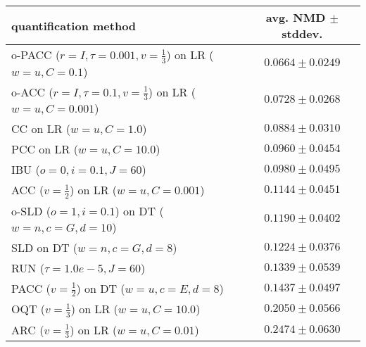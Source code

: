 \begin{tabular}{lc}
  \toprule
  quantification method & avg. NMD $\pm$ stddev. \\
  \midrule
  o-PACC ($r=I, \tau=0.001, v=\frac{1}{3}$) on LR ($w=u, C=0.1$) & $\mathbf{0.0664 \pm 0.0249}$ \\
  o-ACC ($r=I, \tau=0.1, v=\frac{1}{3}$) on LR ($w=u, C=0.001$) & $0.0728 \pm 0.0268$ \\
  CC on LR ($w=u, C=1.0$) & $0.0884 \pm 0.0310$ \\
  PCC on LR ($w=u, C=10.0$) & $0.0960 \pm 0.0454$ \\
  IBU ($o=0, i=0.1, J=60$) & $0.0980 \pm 0.0495$ \\
  ACC ($v=\frac{1}{2}$) on LR ($w=u, C=0.001$) & $0.1144 \pm 0.0451$ \\
  o-SLD ($o=1, i=0.1$) on DT ($w=n, c=G, d=10$) & $0.1190 \pm 0.0402$ \\
  SLD on DT ($w=n, c=G, d=8$) & $0.1224 \pm 0.0376$ \\
  RUN ($\tau=1.0e-5, J=60$) & $0.1339 \pm 0.0539$ \\
  PACC ($v=\frac{1}{2}$) on DT ($w=u, c=E, d=8$) & $0.1437 \pm 0.0497$ \\
  OQT ($v=\frac{1}{3}$) on LR ($w=u, C=10.0$) & $0.2050 \pm 0.0566$ \\
  ARC ($v=\frac{1}{3}$) on LR ($w=u, C=0.01$) & $0.2474 \pm 0.0630$ \\
  \bottomrule
\end{tabular}
